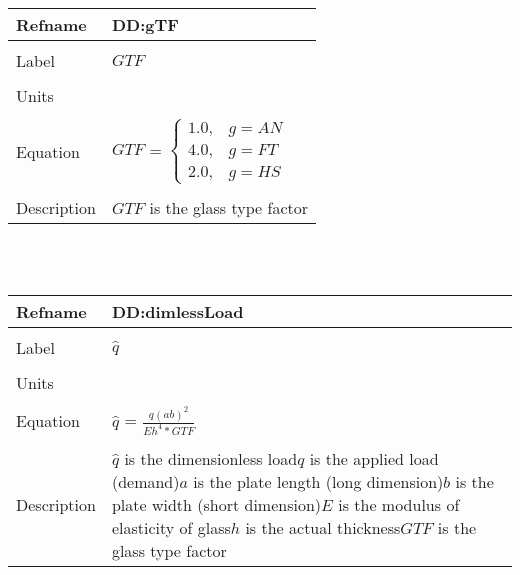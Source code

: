\documentclass[12pt]{article}
\begin{document}
~\newline
\noindent \begin{minipage}{\textwidth}
\begin{tabular}{p{} p{}}
\toprule \textbf{Refname} & \textbf{DD:gTF}
\label{DD:gTF}
\\ \midrule \\
Label & $GTF$
\\ \midrule \\
Units & 
\\ \midrule \\
Equation & $GTF$ = $\begin{cases}
1.0, & g=AN\\
4.0, & g=FT\\
2.0, & g=HS
\end{cases}$
\\ \midrule \\
Description & $GTF$ is the glass type factor
\\ \bottomrule \end{tabular}
\end{minipage}\\
~\newline
\noindent \begin{minipage}{\textwidth}
\begin{tabular}{p{} p{}}
\toprule \textbf{Refname} & \textbf{DD:dimlessLoad}
\label{DD:dimlessLoad}
\\ \midrule \\
Label & $\hat{q}$
\\ \midrule \\
Units & 
\\ \midrule \\
Equation & $\hat{q}$ = $\frac{q\left(ab\right)^{2}}{Eh^{4}*GTF}$
\\ \midrule \\
Description & $\hat{q}$ is the dimensionless load\newline$q$ is the applied load (demand)\newline$a$ is the plate length (long dimension)\newline$b$ is the plate width (short dimension)\newline$E$ is the modulus of elasticity of glass\newline$h$ is the actual thickness\newline$GTF$ is the glass type factor
\\ \bottomrule \end{tabular}
\end{minipage}\\
\end{document}

